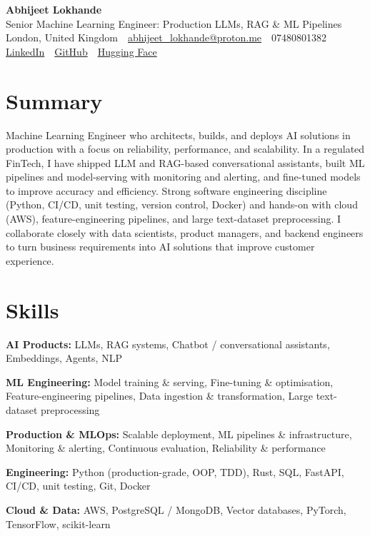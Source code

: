 \documentclass[10pt,a4paper]{article}
\newcommand{\sep}{\,\textcolor{accent!60}{\textbar}\,}
\begin{document}
\begin{center}
  {\fontsize{24}{26}\selectfont\bfseries Abhijeet Lokhande}\\[3pt]
  {\color{accent}\large Senior Machine Learning Engineer: Production LLMs, RAG \& ML Pipelines}\\[5pt]
  {\small
    London, United Kingdom \sep
    \href{mailto:abhijeet_lokhande@proton.me}{abhijeet\_lokhande@proton.me} \sep
    07480801382 \\[2pt]
    \href{https://www.linkedin.com/in/ablds/}{LinkedIn} \sep
    \href{https://github.com/abhijeetscode}{GitHub} \sep
    \href{https://huggingface.co/ab-ai}{Hugging Face}
  }
\end{center}
\vspace{2pt}

\section{Summary}
Machine Learning Engineer who architects, builds, and deploys AI solutions in production with a focus on reliability, performance, and scalability. In a regulated FinTech, I have shipped LLM and RAG-based conversational assistants, built ML pipelines and model-serving with monitoring and alerting, and fine-tuned models to improve accuracy and efficiency. Strong software engineering discipline (Python, CI/CD, unit testing, version control, Docker) and hands-on with cloud (AWS), feature-engineering pipelines, and large text-dataset preprocessing. I collaborate closely with data scientists, product managers, and backend engineers to turn business requirements into AI solutions that improve customer experience.

\section{Skills}
\begin{tight}
  \item[\textcolor{accent}{\small$\bullet$}] \textbf{AI Products:} LLMs, RAG systems, Chatbot / conversational assistants, Embeddings, Agents, NLP
  \item[\textcolor{accent}{\small$\bullet$}] \textbf{ML Engineering:} Model training \& serving, Fine-tuning \& optimisation, Feature-engineering pipelines, Data ingestion \& transformation, Large text-dataset preprocessing
  \item[\textcolor{accent}{\small$\bullet$}] \textbf{Production \& MLOps:} Scalable deployment, ML pipelines \& infrastructure, Monitoring \& alerting, Continuous evaluation, Reliability \& performance
  \item[\textcolor{accent}{\small$\bullet$}] \textbf{Engineering:} Python (production-grade, OOP, TDD), Rust, SQL, FastAPI, CI/CD, unit testing, Git, Docker
  \item[\textcolor{accent}{\small$\bullet$}] \textbf{Cloud \& Data:} AWS, PostgreSQL / MongoDB, Vector databases, PyTorch, TensorFlow, scikit-learn
\end{tight}
\end{document}
